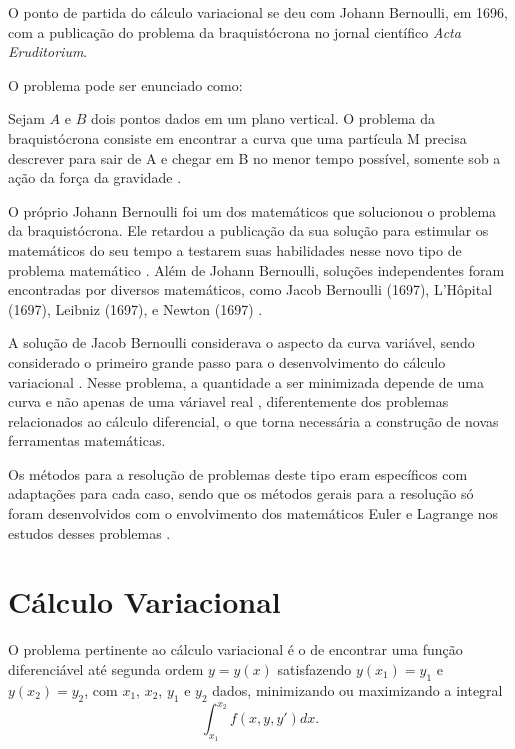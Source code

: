 O ponto de partida do cálculo variacional se deu com Johann Bernoulli, em 1696, com a publicação do problema da braquistócrona no jornal científico \textit{Acta Eruditorium}. \cite{hist_courant}

O problema pode ser enunciado como:
\begin{citacao}
Sejam $A$ e $B$ dois pontos dados em um plano vertical. O problema da braquistócrona consiste em encontrar a curva que uma partícula M precisa descrever para sair de A e chegar em B no menor tempo possível, somente sob a ação da força da gravidade \cite[p. 3]{calcvar}.
\end{citacao}

O próprio Johann Bernoulli foi um dos matemáticos que solucionou o problema da braquistócrona. Ele retardou a publicação da sua solução para estimular os matemáticos do seu tempo a testarem suas habilidades nesse novo tipo de problema matemático \cite{hist_courant}. Além de Johann Bernoulli, soluções independentes foram encontradas por diversos matemáticos, como Jacob Bernoulli (1697), L'Hôpital (1697), Leibniz (1697), e Newton (1697) \cite{hist_still}.

A solução de Jacob Bernoulli considerava o aspecto da curva variável, sendo considerado o primeiro grande passo para o desenvolvimento do cálculo variacional \cite{hist_still}. Nesse problema, a quantidade a ser minimizada depende de uma curva e não apenas de uma váriavel real \cite{hist_courant}, diferentemente dos problemas relacionados ao cálculo diferencial, o que torna necessária a construção de novas ferramentas matemáticas. 

Os métodos para a resolução de problemas deste tipo eram específicos com adaptações para cada caso, sendo que os métodos gerais para a resolução só foram desenvolvidos com o envolvimento dos matemáticos Euler e Lagrange nos estudos desses problemas \cite{hist_courant}.


\chapter{Cálculo Variacional}

O problema pertinente ao cálculo variacional é o de encontrar uma função diferenciável até segunda ordem $y=y(x)$ satisfazendo $y(x_1)=y_1$ e $y(x_2)=y_2$, com $x_1$, $x_2$, $y_1$ e $y_2$ dados, minimizando ou maximizando a integral
\begin{equation}
	\int_{x_1}^{x_2} f(x,y,y')dx\text{.}
	\label{eqn:int_funcional}
\end{equation}

